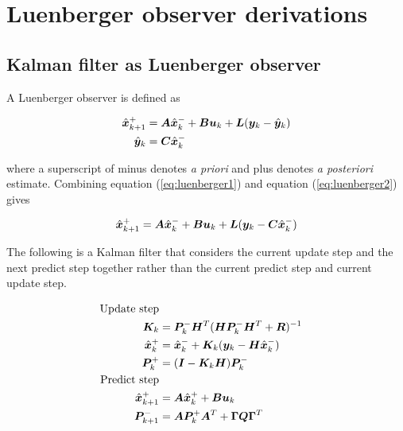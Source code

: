 \section{Luenberger observer derivations}

\subsection{Kalman filter as Luenberger observer}
\label{subsec:app_kalman_luenberger}

A Luenberger observer is defined as

\begin{align}
  \hat{\mtx{x}}_{k+1}^+ &= \mtx{A}\hat{\mtx{x}}_k^- + \mtx{B}\mtx{u}_k + \mtx{L}
    (\mtx{y}_k - \hat{\mtx{y}}_k) \label{eq:luenberger1} \\
  \hat{\mtx{y}}_k &= \mtx{C} \hat{\mtx{x}}_k^- \label{eq:luenberger2}
\end{align}

where a superscript of minus denotes \textit{a priori} and plus denotes
\textit{a posteriori} estimate. Combining equation (\ref{eq:luenberger1}) and
equation (\ref{eq:luenberger2}) gives

\begin{equation} \label{eq:luenberger}
  \hat{\mtx{x}}_{k+1}^+ = \mtx{A}\hat{\mtx{x}}_k^- + \mtx{B}\mtx{u}_k + \mtx{L}
    (\mtx{y}_k - \mtx{C}\hat{\mtx{x}}_k^-)
\end{equation}

The following is a Kalman filter that considers the current update step and the
next predict step together rather than the current predict step and current
update step.

\begin{align}
  \text{Update step} \nonumber \\
  \mtx{K}_k &= \mtx{P}_k^- \mtx{H}^T (\mtx{H}\mtx{P}_k^- \mtx{H}^T +
    \mtx{R})^{-1} \\
  \hat{\mtx{x}}_k^+ &= \hat{\mtx{x}}_k^- + \mtx{K}_k(\mtx{y}_k -
    \mtx{H}\hat{\mtx{x}}_k^-) \label{eq:post2_x} \\
  \mtx{P}_k^+ &= (\mtx{I} - \mtx{K}_k\mtx{H})\mtx{P}_k^- \\
  \text{Predict step} \nonumber \\
  \hat{\mtx{x}}_{k+1}^+ &= \mtx{A}\hat{\mtx{x}}_k^+ + \mtx{B}\mtx{u}_k
    \label{eq:pre2_x} \\
  \mtx{P}_{k+1}^- &= \mtx{A} \mtx{P}_k^+ \mtx{A}^T +
    \mtx{\Gamma}\mtx{Q}\mtx{\Gamma}^T
\end{align}

